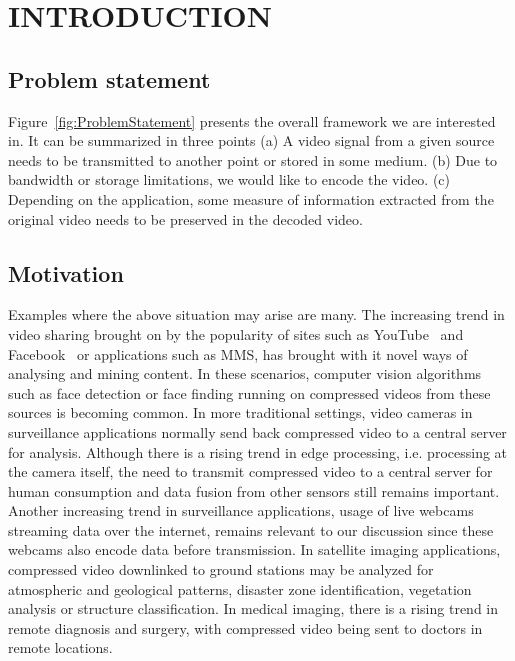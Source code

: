 \documentclass{article}
\begin{document}
\section{INTRODUCTION}

\subsection{Problem statement}
Figure~\ref{fig:ProblemStatement} presents the overall framework we are interested in.  It can be summarized in three points (a) A video signal from a given source needs to be transmitted to another point or stored in some medium. (b) Due to bandwidth or storage limitations, we would like to encode the video. (c) Depending on the application, some measure of information extracted from the original video needs to be preserved in the decoded video. 

\subsection{Motivation}
Examples where the above situation may arise are many.  The increasing trend in video sharing brought on by the popularity of sites such as YouTube~\cite{YouTube} and Facebook~\cite{Facebook} or applications such as MMS, has brought with it novel ways of analysing and mining content.  In these scenarios, computer vision algorithms such as face detection or face finding running on compressed videos from these sources is becoming common.  In more traditional settings, video cameras in surveillance applications normally send back compressed video to a central server for analysis.  Although there is a rising trend in edge processing, i.e. processing at the camera itself, the need to transmit compressed video to a central server for human consumption and data fusion from other sensors still remains important.  Another increasing trend in surveillance applications, usage of live webcams streaming data over the internet, remains relevant to our discussion since these webcams also encode data before transmission.  In satellite imaging applications, compressed video downlinked to ground stations may be analyzed for atmospheric and geological patterns, disaster zone identification, vegetation analysis or structure classification.  In medical imaging, there is a rising trend in remote diagnosis and surgery, with compressed video being sent to doctors in remote locations. 
\end{document}
